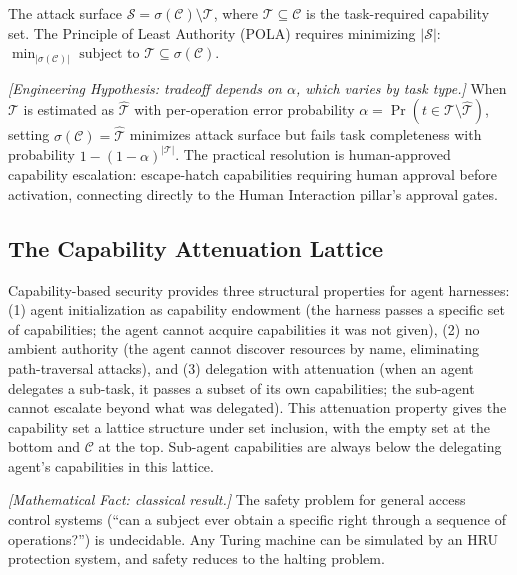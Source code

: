 \begin{definition}
\label{def:attack-surface-sec}
The attack surface $\mathcal{S} = \sigma(\mathcal{C}) \setminus \mathcal{T}$, where $\mathcal{T} \subseteq \mathcal{C}$ is the task-required capability set. The Principle of Least Authority (POLA) \citep{saltzer1975protection} requires minimizing $|\mathcal{S}|$: $\min_{|\sigma(\mathcal{C})|} \text{ subject to } \mathcal{T} \subseteq \sigma(\mathcal{C})$.
\end{definition}

\begin{proposition}
\emph{[Engineering Hypothesis: tradeoff depends on $\alpha$, which varies by task type.]}
\label{prop:attack-surface-sec}
When $\mathcal{T}$ is estimated as $\hat{\mathcal{T}}$ with per-operation error probability $\alpha = \Pr(t \in \mathcal{T} \setminus \hat{\mathcal{T}})$, setting $\sigma(\mathcal{C}) = \hat{\mathcal{T}}$ minimizes attack surface but fails task completeness with probability $1 - (1-\alpha)^{|\mathcal{T}|}$. The practical resolution is human-approved capability escalation: escape-hatch capabilities requiring human approval before activation, connecting directly to the Human Interaction pillar's approval gates.
\end{proposition}

\subsection{The Capability Attenuation Lattice}

Capability-based security provides three structural properties for agent harnesses: (1) agent initialization as capability endowment (the harness passes a specific set of capabilities; the agent cannot acquire capabilities it was not given), (2) no ambient authority (the agent cannot discover resources by name, eliminating path-traversal attacks), and (3) delegation with attenuation (when an agent delegates a sub-task, it passes a subset of its own capabilities; the sub-agent cannot escalate beyond what was delegated). This attenuation property gives the capability set a lattice structure under set inclusion, with the empty set at the bottom and $\mathcal{C}$ at the top. Sub-agent capabilities are always below the delegating agent's capabilities in this lattice.

\begin{theorem}
\emph{[Mathematical Fact: classical result.]}
\label{thm:hru-sec}
The safety problem for general access control systems (``can a subject ever obtain a specific right through a sequence of operations?'') is undecidable. Any Turing machine can be simulated by an HRU protection system, and safety reduces to the halting problem.
\end{theorem}

